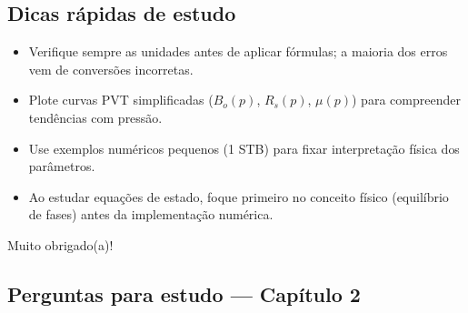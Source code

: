 \documentclass[11pt,a4paper]{article}
\begin{document}
\subsection{Dicas rápidas de estudo}
\begin{itemize}
\item Verifique sempre as unidades antes de aplicar fórmulas; a maioria dos erros vem de conversões incorretas.
\item Plote curvas PVT simplificadas ($B_o(p)$, $R_s(p)$, $\mu(p)$) para compreender tendências com pressão.
\item Use exemplos numéricos pequenos (1 STB) para fixar interpretação física dos parâmetros.
\item Ao estudar equações de estado, foque primeiro no conceito físico (equilíbrio de fases) antes da implementação numérica.
\end{itemize}


Muito obrigado(a)!
\clearpage
\subsection*{Perguntas para estudo --- Capítulo 2}

\clearpage
\end{document}
